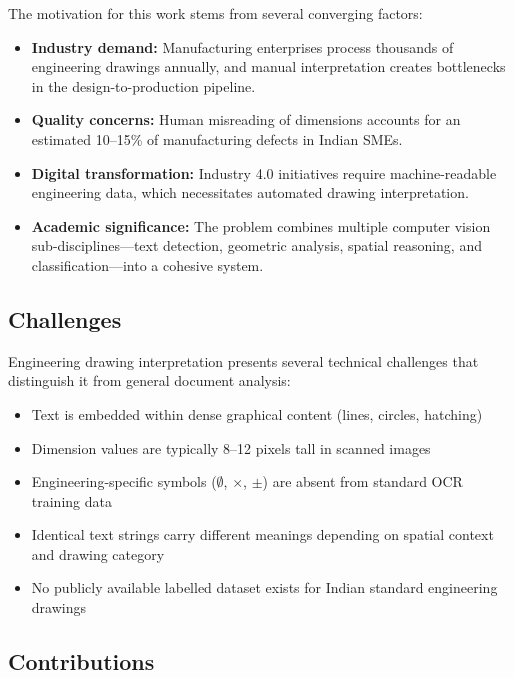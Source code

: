 \documentclass[12pt,a4paper]{article}
\begin{document}
The motivation for this work stems from several converging factors:

\begin{itemize}[noitemsep]
    \item \textbf{Industry demand:} Manufacturing enterprises process thousands of engineering drawings annually, and manual interpretation creates bottlenecks in the design-to-production pipeline.
    \item \textbf{Quality concerns:} Human misreading of dimensions accounts for an estimated 10--15\% of manufacturing defects in Indian SMEs.
    \item \textbf{Digital transformation:} Industry 4.0 initiatives require machine-readable engineering data, which necessitates automated drawing interpretation.
    \item \textbf{Academic significance:} The problem combines multiple computer vision sub-disciplines---text detection, geometric analysis, spatial reasoning, and classification---into a cohesive system.
\end{itemize}

\subsection{Challenges}

Engineering drawing interpretation presents several technical challenges that distinguish it from general document analysis:

\begin{itemize}[noitemsep]
    \item Text is embedded within dense graphical content (lines, circles, hatching)
    \item Dimension values are typically 8--12 pixels tall in scanned images
    \item Engineering-specific symbols ($\emptyset$, $\times$, $\pm$) are absent from standard OCR training data
    \item Identical text strings carry different meanings depending on spatial context and drawing category
    \item No publicly available labelled dataset exists for Indian standard engineering drawings
\end{itemize}

\subsection{Contributions}
\end{document}
